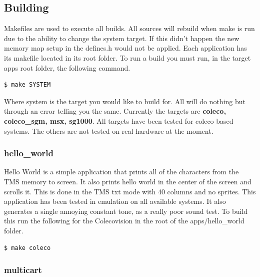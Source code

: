 


\subsection{Building}

\par
Makefiles are used to execute all builds. All sources will rebuild when make is run due to the ability to change the
system target. If this didn't happen the new memory map setup in the defines.h would not be applied. Each application
has its makefile located in its root folder. To run a build you must run, in the target apps root folder, the following
command.

\begin{lstlisting}[language=bash]
  $ make SYSTEM
\end{lstlisting}

Where system is the target you would like to build for. All will do nothing but through an error telling you the same.
Currently the targets are \textbf{coleco, coleco\_sgm, msx, sg1000}. All targets have been tested for coleco based systems.
The others are not tested on real hardware at the moment.

\subsubsection{hello\_world}

\par
Hello World is a simple application that prints all of the characters from the TMS memory to screen. It also prints hello world in the
center of the screen and scrolls it. This is done in the TMS txt mode with 40 columns and no sprites. This application has been
tested in emulation on all available systems. It also generates a single annoying constant tone, as a really poor sound test. To build this
run the following for the Colecovision in the root of the apps/hello\_world folder.

\begin{lstlisting}[language=bash]
  $ make coleco
\end{lstlisting}

\subsubsection{multicart}


